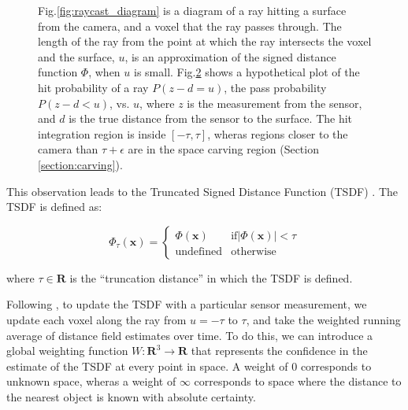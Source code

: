 \documentclass[10pt,twocolumn,letterpaper]{article}
\newcommand{\ssnote}[1]{{\xxnote{SS}{red}{#1}}}
\newcommand{\xxnote}[3]{}
\renewcommand{\xxnote}[3]{\color{#2}{#1: #3}}
\newcommand{\figref}[1]{Fig.\ref{#1}}
\begin{document}
\begin{figure}
\begin{subfigure}{1.0\columnwidth}
         \caption{\ssnote{Text is too small to read. Must be at least as big as smallest allowable paper text.}}
  \label{fig:integration_diagram}
   \end{subfigure}
   \caption{\figref{fig:raycast_diagram} is a diagram of a ray hitting a
   surface from the camera, and a voxel that the ray passes through. The length of the ray from the point at
      which the ray intersects the voxel and the surface, $u$, is an
      approximation of the signed distance function $\Phi$, when $u$ is small.
      \figref{fig:integration_diagram} shows a hypothetical plot of the
      hit probability of a ray $P\left(z - d = u \right) $, the pass
      probability $P\left(z - d < u\right)$, vs. $u$, where $z$ is the
      measurement from the sensor, and $d$ is the true distance from the sensor
      to the surface. The hit integration region is inside $[-\tau, \tau]$,
      wheras regions closer to the camera than  $\tau + \epsilon$ are in the space carving region (Section \ref{section:carving}). }
\end{figure} 

This observation leads to the Truncated Signed Distance Function (TSDF)
\cite{Curless1996}. The TSDF is defined as:

\begin{equation}
	\Phi_{\tau}(\mathbf{x}) = 
	\begin{cases}
		\Phi(\mathbf{x}) &  \text{if} |\Phi(\mathbf{x})| < \tau \\
		\text{undefined} & \text{otherwise}
	\end{cases}
\end{equation}

\noindent where $\tau \in \mathbf{R}$ is the ``truncation distance'' in which
the TSDF is defined.

Following \cite{Curless1996}, to update the TSDF with a particular sensor
measurement, we update each voxel along the ray from $u = -\tau$ to $\tau$, and
take the weighted running average of distance field estimates over time. To do
this, we can introduce a global weighting function $W : \mathbf{R}^3 \to \mathbf{R}$ that represents the
confidence in the estimate of the TSDF at every point in space. A weight of $0$
corresponds to unknown space, wheras a weight of $\infty$ corresponds to space
where the distance to the nearest object is known with absolute certainty.
\end{document}
